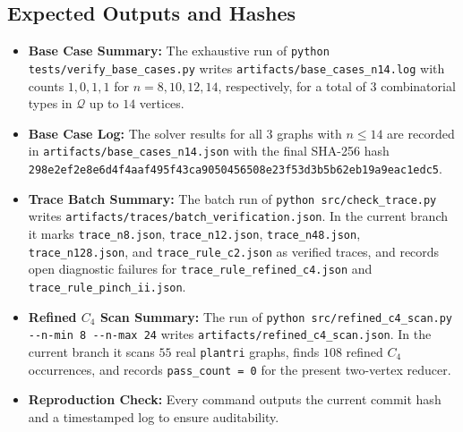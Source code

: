 \documentclass[12pt]{article}
\theoremstyle{definition}
\begin{document}
\subsection{Expected Outputs and Hashes}

\begin{itemize}
    \item \textbf{Base Case Summary:} The exhaustive run of \verb|python tests/verify_base_cases.py| writes \verb|artifacts/base_cases_n14.log| with counts $1,0,1,1$ for $n=8,10,12,14$, respectively, for a total of $3$ combinatorial types in $\mathcal{Q}$ up to $14$ vertices.
    \item \textbf{Base Case Log:} The solver results for all $3$ graphs with $n \le 14$ are recorded in \verb|artifacts/base_cases_n14.json| with the final SHA-256 hash \texttt{298e2ef2e8e6d4f4aaf495f43ca9050456508e23f53d3b5b62eb19a9eac1edc5}.
    \item \textbf{Trace Batch Summary:} The batch run of \verb|python src/check_trace.py| writes \verb|artifacts/traces/batch_verification.json|. In the current branch it marks \verb|trace_n8.json|, \verb|trace_n12.json|, \verb|trace_n48.json|, \verb|trace_n128.json|, and \verb|trace_rule_c2.json| as verified traces, and records open diagnostic failures for \verb|trace_rule_refined_c4.json| and \verb|trace_rule_pinch_ii.json|.
    \item \textbf{Refined $C_4$ Scan Summary:} The run of \verb|python src/refined_c4_scan.py --n-min 8 --n-max 24| writes \verb|artifacts/refined_c4_scan.json|. In the current branch it scans $55$ real \verb|plantri| graphs, finds $108$ refined $C_4$ occurrences, and records \verb|pass_count = 0| for the present two-vertex reducer.
    \item \textbf{Reproduction Check:} Every command outputs the current commit hash and a timestamped log to ensure auditability.
\end{itemize}
\end{document}

